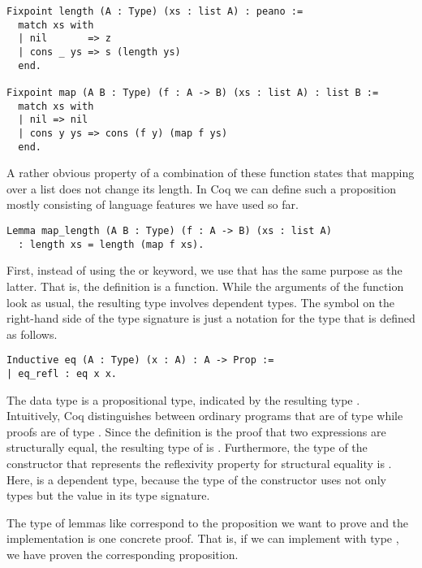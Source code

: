 \begin{verbatim}
Fixpoint length (A : Type) (xs : list A) : peano :=
  match xs with
  | nil       => z
  | cons _ ys => s (length ys)
  end.

Fixpoint map (A B : Type) (f : A -> B) (xs : list A) : list B :=
  match xs with
  | nil => nil
  | cons y ys => cons (f y) (map f ys)
  end.
\end{verbatim}

A rather obvious property of a combination of these function states that mapping over a list does not change its length.
In Coq we can define such a proposition mostly consisting of language features we have used so far.

\begin{verbatim}
Lemma map_length (A B : Type) (f : A -> B) (xs : list A)
  : length xs = length (map f xs).
\end{verbatim}

First, instead of using the  or  keyword, we use  that has the same purpose as the latter.
That is, the definition  is a function.
While the arguments of the function  look as usual, the resulting type involves dependent types.
The symbol \cinl{=} on the right-hand side of the type signature is just a notation for the type  that is defined as follows.

\begin{verbatim}
Inductive eq (A : Type) (x : A) : A -> Prop :=
| eq_refl : eq x x.
\end{verbatim}

The data type  is a propositional type, indicated by the resulting type .
Intuitively, Coq distinguishes between ordinary programs that are of type  while proofs are of type .
Since the definition  is the proof that two expressions are structurally equal, the resulting type of  is .
Furthermore, the type of the constructor  that represents the reflexivity property for structural equality is .
Here,  is a dependent type, because the type of the constructor  uses not only types but the value  in its type signature.

The type of lemmas like  correspond to the proposition we want to prove and the implementation is one concrete proof.
That is, if we can implement  with type , we have proven the corresponding proposition.

